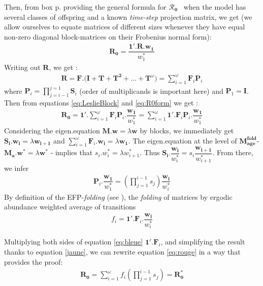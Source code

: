 \documentclass[10pt,a4paper]{article}
\newcommand{\Rzero}{$\boldsymbol{\mathcal{R}_{0}}$  }
\newcommand{\chapii}{\citep{Coste2017}}
\newcommand{\Ma}{$\mathbf{M^{fold}_{age}}$}
\begin{document}
Then, from box p. \pageref{box:noteonR0} providing the general formula for \Rzero\ when the model has several classes of offspring and a known \emph{time-step} projection matrix, we get (we allow ourselves to equate matrices of different sizes whenever they have equal non-zero diagonal block-matrices on their Frobenius normal form): 
\begin{eqnarray}
\mathbf{R_0}=\dfrac{\bm{1}'.\mathbf{R}.\bm{w_1}}{w^{*}_{1}}
\label{eq:R0form}
\end{eqnarray}
Writing out $\mathbf{R}$, we get :
\begin{eqnarray}
\mathbf{R}=\mathbf{F.(I+T+T^{2}} + \dots + \mathbf{T}^{\omega})=\sum_{i=1}^{\omega} \mathbf{F}_{i}\mathbf{P}_{i} 
\label{eq:LeslieBlock}
\end{eqnarray}
 where $\mathbf{P}_{i}=\prod_{j=i-1}^{j=1}\mathbf{S}_{i}$ (order of multiplicands is important here) and  $\mathbf{P}_{1}=\mathbf{I}$. Then from equations \ref{eq:LeslieBlock} and \ref{eq:R0form} we get :
 \begin{eqnarray}
 \mathbf{R_0}=\bm{1}'.\sum_{i=1}^{\omega} \mathbf{F}_{i}\mathbf{P}_{i} .\dfrac{\bm{w_1}}{w^{*}_{1}}=\sum_{i=1}^{\omega} \bm{1}'.\mathbf{F}_{i}\mathbf{P}_{i} .\dfrac{\bm{w_1}}{w^{*}_{1}}
 \label{eq:rouge}
  \end{eqnarray}
 Considering the eigen.equation $\mathbf{M}.\bm{w}=\lambda\bm{w}$ by blocks, we immediately get $\mathbf{S_{i}}.\bm{w_{i}}=\lambda\bm{w_{i+1}}$ and $\sum_{i=1}^{\omega} \mathbf{F}_{i}.\bm{w_{i}}= \lambda\bm{w_{1}} $. 
The eigen.equation at the level of \Ma - $\mathbf{M_a}.\bm{w^{*}}=\lambda\bm{w^{*}}$ - implies that $s_{i}.{w^{*}_{i}}=\lambda{w^{*}_{i+1}}$. Thus $ \mathbf{S_{i}}.\dfrac{\bm{w_{i}}}{{w^{*}_{i}}}=s_{i}\dfrac{\bm{w_{i+1}}}{{w^{*}_{i+1}}}$.
From there, we infer 
\begin{eqnarray}  
  \mathbf{P}_{i} .\dfrac{\bm{w_{1}}}{{w^{*}_{1}}}=(\prod_{j=1}^{i-1}s_{j})\dfrac{\bm{w_{i}}}{{w^{*}_{i}}}
   \label{eq:bleue}
\end{eqnarray}
By definition of the EFP-\emph{folding} (see \chapii), the \emph{folding} of matrices by ergodic abundance weighted average of transitions 
  \begin{eqnarray}
  f_{i}=\mathbf{1}'.\mathbf{F}_{i}.\dfrac{\bm{w_{i}}}{{w^{*}_{i}}}
  \label{jaune}
  \end{eqnarray} 

Multiplying both sides of equation \ref{eq:bleue} $\mathbf{1}'.\mathbf{F}_{i}$, and simplifying the result thanks to equation \ref{jaune}, we can rewrite equation \ref{eq:rouge} in a way that provides the proof:
\begin{eqnarray}
\mathbf{R_0}=\sum_{i=1}^{\omega}  f_{i}(\prod_{j=1}^{i-1}s_{j})=\mathbf{R_0^{*}}
\end{eqnarray}
\end{document}
